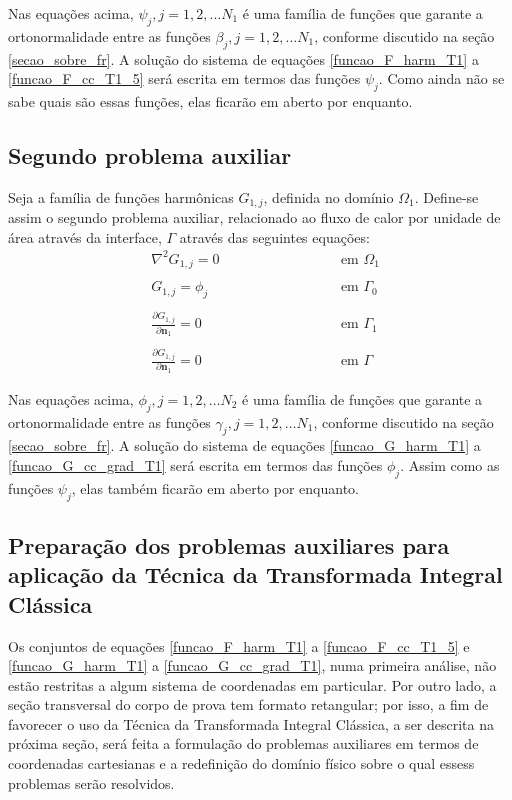 Nas equações acima, $\psi_j, j=1,2,\ldots N_1$ é uma família de funções que garante a ortonormalidade entre as funções $\beta_j, j=1,2,\ldots N_1$, conforme discutido
na seção \ref{secao_sobre_fr}. 
A solução do sistema de equações \eqref{funcao_F_harm_T1} a \eqref{funcao_F_cc_T1_5} será escrita em termos das funções $\psi_j$.
Como ainda não se sabe quais são essas funções, elas ficarão em aberto por enquanto. 

\subsection{Segundo problema auxiliar}\label{secao_do_segundo}
Seja a família de funções harmônicas $G_{1, j}$, definida no domínio $\Omega_1$. Define-se assim o segundo
problema auxiliar, relacionado ao fluxo de calor por unidade de área através da interface, $\Gamma$ através das seguintes equações:
\begin{subequations}
\begin{alignat}{2}
	& \nabla^2 G_{1,j} = 0 \quad\quad\quad\quad\quad && \text{ em } \Omega_1 \label{funcao_G_harm_T1} \\ \nonumber \\
	& G_{1,j} = \phi_j && \text{ em } \Gamma_0  \label{funcao_G_cc_T1_2} \\ \nonumber \\
	& \frac{\partial G_{1,j}}{\partial \mathbf{n}_1} = 0 && \text{ em }  \Gamma_1 \label{funcao_G_cc_T1_1} \\ \nonumber \\
	& \frac{\partial G_{1,j}}{\partial\mathbf{n}_1} = 0 \quad\quad\quad\quad\quad\quad\quad\quad && \text{ em }  \Gamma \label{funcao_G_cc_grad_T1}
\end{alignat}
\end{subequations}

Nas equações acima, $\phi_j, j=1,2,\ldots N_2$ é uma família de funções que garante a ortonormalidade entre as funções $\gamma_j, j=1,2,\ldots N_1$, conforme discutido
na seção \ref{secao_sobre_fr}. A solução do sistema de equações \eqref{funcao_G_harm_T1} a \eqref{funcao_G_cc_grad_T1} será escrita em termos das funções $\phi_j$.
Assim como as funções $\psi_j$, elas também ficarão em aberto por enquanto.

\subsection{Preparação dos problemas auxiliares para aplicação da Técnica da Transformada Integral Clássica}
Os conjuntos de equações \eqref{funcao_F_harm_T1} a \eqref{funcao_F_cc_T1_5} e \eqref{funcao_G_harm_T1} a \eqref{funcao_G_cc_grad_T1}, numa primeira análise,
não estão restritas a algum sistema de coordenadas em particular. Por outro lado, a seção transversal do corpo de prova tem formato retangular; por isso,
a fim de favorecer o uso da Técnica da Transformada Integral Clássica, a ser descrita na próxima seção,
será feita a formulação do problemas auxiliares em termos de coordenadas cartesianas e a redefinição do domínio físico sobre o qual essess problemas
serão resolvidos.


